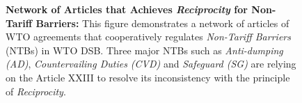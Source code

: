 \begin{figure}[h]
    \centering{
        
    }
    \caption{{\bf Network of Articles that Achieves \textit{Reciprocity} for Non-Tariff Barriers:}
        This figure demonstrates a network of articles of WTO agreements
        that cooperatively regulates \textit{Non-Tariff Barriers} (NTBs) in WTO DSB.
        Three major NTBs such as \textit{Anti-dumping (AD)}, \textit{Countervailing Duties (CVD)}
        and \textit{Safeguard (SG)} are relying on the Article XXIII to resolve its inconsistency with the principle of \textit{Reciprocity}.
    }
    \label{fig:ntb-explained}
\end{figure}